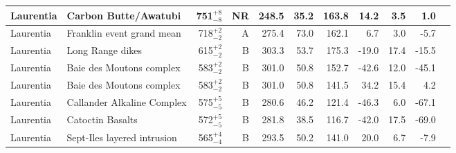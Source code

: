 \documentclass[twocolumn, switch]{article} %
\begin{document}
{\begin{landscape}
\begin{ThreePartTable}
\begin{longtable}{p{1.4 in}p{1.2 in}rrrrrrrrp{1.2 in}}
                     Laurentia &                               Carbon Butte/Awatubi &      751$^{+8}_{-8}$ &     NR &     248.5 &      35.2 & 163.8 &  14.2 &       3.5 &         1.0 &                                 \cite{Eyster2020a} \\ \hline
                     Laurentia &                          Franklin event grand mean &      718$^{+2}_{-2}$ &      A &     275.4 &      73.0 & 162.1 &   6.7 &       3.0 &        -5.7 &                               \cite{Denyszyn2009b} \\ \hline
                     Laurentia &                                   Long Range dikes &      615$^{+2}_{-2}$ &      B &     303.3 &      53.7 & 175.3 & -19.0 &      17.4 &       -15.5 &                                 \cite{Murthy1992a} \\ \hline
                     Laurentia &                           Baie des Moutons complex &      583$^{+2}_{-2}$ &      B &     301.0 &      50.8 & 152.7 & -42.6 &      12.0 &       -45.1 &                             \cite{McCausland2011a} \\ \hline
                     Laurentia &                           Baie des Moutons complex &      583$^{+2}_{-2}$ &      B &     301.0 &      50.8 & 141.5 &  34.2 &      15.4 &         4.2 &                             \cite{McCausland2011a} \\ \hline
                     Laurentia &                         Callander Alkaline Complex &      575$^{+5}_{-5}$ &      B &     280.6 &      46.2 & 121.4 & -46.3 &       6.0 &       -67.1 &                                 \cite{Symons1991a} \\ \hline
                     Laurentia &                                   Catoctin Basalts &      572$^{+5}_{-5}$ &      B &     281.8 &      38.5 & 116.7 & -42.0 &      17.5 &       -69.0 &                                  \cite{Meert1994a} \\ \hline
                     Laurentia &                        Sept-Iles layered intrusion &      565$^{+4}_{-4}$ &      B &     293.5 &      50.2 & 141.0 &  20.0 &       6.7 &        -7.9 &                                \cite{Tanczyk1987a} \\ \hline
\end{longtable}
\end{ThreePartTable}
\end{landscape}
}


\end{document}
